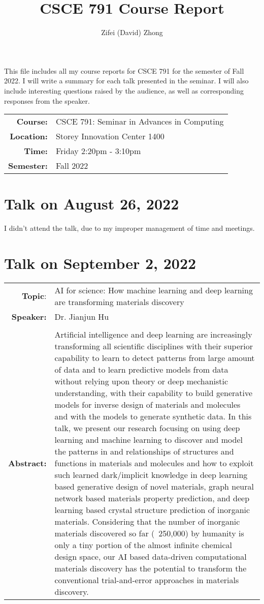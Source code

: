 \documentclass[11pt, oneside]{article}   	%
\title{CSCE 791 Course Report}
\author{Zifei (David) Zhong}
\begin{document}
\maketitle

This file includes all my course reports for CSCE 791 for the semester of Fall 2022. I will write a summary for each talk presented in the seminar. I will also include interesting questions raised by the audience, as well as corresponding responses from the speaker.\\

\begin{center}
\begin{tabularx}{0.65\textwidth}{r X}
\textbf{Course:} & CSCE 791: Seminar in Advances in Computing\\
\textbf{Location:} & Storey Innovation Center 1400\\
\textbf{Time:} & Friday 2:20pm - 3:10pm\\
\textbf{Semester:} & Fall 2022
\end{tabularx}
\end{center}

\newpage
\section{Talk on August 26, 2022}
I didn't attend the talk, due to my improper management of time and meetings.

\newpage
\section{Talk on September 2, 2022}
\begin{tabularx} {\textwidth}{r X}
\textbf{Topic}: & AI for science:  How machine learning and deep learning are transforming materials discovery \\
\textbf{Speaker:} & Dr. Jianjun Hu \\\\
\textbf{Abstract:} & Artificial intelligence and deep learning are increasingly transforming all scientific disciplines with their superior capability to learn to detect patterns from large amount of data and to learn predictive models from  data without relying upon theory or deep mechanistic understanding, with their capability to build generative models for inverse design of materials and molecules and with the models to generate synthetic data. 
In this talk, we present our research focusing on using deep learning and machine learning to discover and model the patterns in and relationships of structures and functions in materials and molecules and how to exploit such learned dark/implicit knowledge in deep learning based generative design of novel materials, graph neural network based materials property prediction, and deep learning based crystal structure prediction of inorganic materials. Considering that the number of inorganic materials discovered so far (~250,000) by humanity is only a tiny portion of the almost infinite chemical design space, our AI based data-driven computational materials discovery has the potential to transform the conventional trial-and-error approaches in materials discovery. \\
\end{tabularx}
\end{document}
